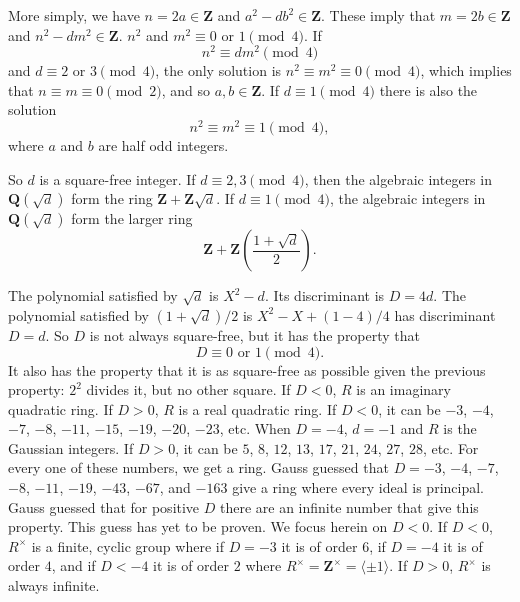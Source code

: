 \documentclass[11pt, oneside]{amsart}
\numberwithin{equation}{section}
\numberwithin{theorem}{section}
\theoremstyle{definition}
\def\Z{\mathbf{Z}}
\def\Q{\mathbf{Q}}
\begin{document}
{More simply, we have $n = 2a\in \Z$ and $a^2 - db^2\in \Z$. These imply that $m = 2b \in \Z$ and $n^2 - dm^2\in \Z$. $n^2$ and $m^2\equiv 0$ or $1 \pmod 4$. If 
$$
n^2 \equiv dm^2 \pmod 4
$$ 
and $d\equiv 2$ or $3\pmod 4$, the only solution is $n^2\equiv m^2 \equiv 0 \pmod 4$, which implies that $n\equiv m \equiv 0 \pmod 2$, and so $a,b\in \Z$. If $d\equiv 1\pmod 4$ there is also the solution 
$$
n^2\equiv m^2 \equiv 1 \pmod 4,
$$
where $a$ and $b$ are half odd integers.

So $d$ is a square-free integer. If $d\equiv 2,3\pmod 4$, then the algebraic integers in $\Q(\sqrt{d})$ form the ring $\Z+\Z\sqrt d$. If $d\equiv 1\pmod 4$, the algebraic integers in $\Q(\sqrt d)$ form the larger ring
$$
\Z+\Z\left(\frac{1+\sqrt d}{2}\right).
$$

The polynomial satisfied by $\sqrt d$ is $X^2 -d$. Its discriminant is $D  = 4d$. The polynomial satisfied by $(1+\sqrt d)/2$ is $X^2 - X + (1-4)/4$ has discriminant $D  = d$. So $D $ is not always square-free, but it has the property that 
$$
D  \equiv 0\textrm{ or } 1\pmod 4.
$$
It also has the property that it is as square-free as possible given the previous property: $2^2$ divides it, but no other square. If $D  < 0$, $R$ is an imaginary quadratic ring. If $D  > 0$, $R$ is a real quadratic ring. If $D  < 0$, it can be $-3$, $-4$, $-7$, $-8$, $-11$, $-15$, $-19$, $-20$, $-23$, etc. When $D = -4$, $d=-1$ and $R$ is the Gaussian integers. If $D  > 0$, it can be $5$, $8$, $12$, $13$, $17$, $21$, $24$, $27$, $28$, etc. For every one of these numbers, we get a ring. Gauss guessed that $D  = -3$, $-4$, $-7$, $-8$, $-11$, $-19$, $-43$, $-67$, and $-163$ give a ring where every ideal is principal. Gauss guessed that for positive $D $ there are an infinite number that give this property. This guess has yet to be proven. We focus herein on $D <0$. If $D <0$, $R^\times $ is a finite, cyclic group where if $D  = -3$ it is of order $6$, if $D  = -4$ it is of order $4$, and if $D  < -4$ it is of order $2$ where $R^\times =\Z^\times = \langle \pm 1\rangle$. If $D  > 0$, $R^\times$ is always infinite. 

}
\end{document}

